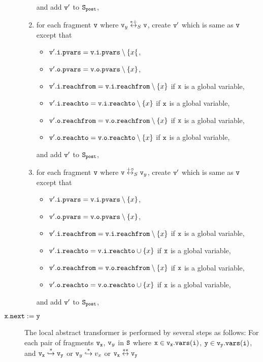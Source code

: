 \begin{description}
\begin{enumerate}
\begin{itemize}
\end{itemize}
and add $\mathtt{v}'$ to $\tt S_{post}$,
\item for each fragment $\mathtt{v}$ where $\mathtt{v}_y \overset{*+}\leftrightarrow_S \mathtt{v}$, create $\mathtt{v}'$ which is same as $\mathtt{v}$ except that 
\begin{itemize}
\item $\mathtt{v}'.\mathtt{i}.\mathtt{pvars} = \mathtt{v}.\mathtt{i}.\mathtt{pvars} \setminus \{x\{$,
\item $\mathtt{v}'.\mathtt{o}.\mathtt{pvars} = \mathtt{v}.\mathtt{o}.\mathtt{pvars} \setminus \left\{x\right\}$,
\item $\mathtt{v}'.\mathtt{i}.\mathtt{reachfrom} = \mathtt{v}.\mathtt{i}.\mathtt{reachfrom} \setminus \left\{x\right\}$ if $\tt x$ is a global variable,
\item $\mathtt{v}'.\mathtt{i}.\mathtt{reachto} = \mathtt{v}.\mathtt{i}.\mathtt{reachto} \setminus \left\{x\right\}$ if $\tt x$ is a global variable,
\item $\mathtt{v}'.\mathtt{o}.\mathtt{reachfrom} = \mathtt{v}.\mathtt{o}.\mathtt{reachfrom} \setminus \left\{x\right\}$ if $\tt x$ is a global variable,
\item $\mathtt{v}'.\mathtt{o}.\mathtt{reachto} = \mathtt{v}.\mathtt{o}.\mathtt{reachto} \setminus \left\{x\right\}$ if $\tt x$ is a global variable,
\end{itemize}
and add $\mathtt{v}'$ to $\tt S_{post}$,
\item for each fragment $\mathtt{v}$ where $\mathtt{v} \overset{+\circ}\leftrightarrow_S \mathtt{v}_y$, create $\mathtt{v}'$ which is same as $\mathtt{v}$ except that 
\begin{itemize}
\item $\mathtt{v}'.\mathtt{i}.\mathtt{pvars} = \mathtt{v}.\mathtt{i}.\mathtt{pvars} \setminus \left\{x\right\}$,
\item $\mathtt{v}'.\mathtt{o}.\mathtt{pvars} = \mathtt{v}.\mathtt{o}.\mathtt{pvars} \setminus \left\{x\right\}$,
\item $\mathtt{v}'.\mathtt{i}.\mathtt{reachfrom} = \mathtt{v}.\mathtt{i}.\mathtt{reachfrom} \setminus \left\{x\right\}$ if $\tt x$ is a global variable,
\item $\mathtt{v}'.\mathtt{i}.\mathtt{reachto} = \mathtt{v}.\mathtt{i}.\mathtt{reachto} \cup \left\{x\right\}$ if $\tt x$ is a global variable,
 \item $\mathtt{v}'.\mathtt{o}.\mathtt{reachfrom} = \mathtt{v}.\mathtt{o}.\mathtt{reachfrom} \setminus \left\{x\right\}$ if $\tt x$ is a global variable,
 \item $\mathtt{v}'.\mathtt{o}.\mathtt{reachto} = \mathtt{v}.\mathtt{o}.\mathtt{reachto} \cup \left\{x\right\}$ if $\tt x$ is a global variable,
\end{itemize}
and add $\mathtt{v}'$ to $\tt S_{post}$,
\end{enumerate}	
\item[${\tt x.next:= y}$]
   The local abstract transformer is performed by several steps as follows: For each pair of fragments $\tt v_x$, $\mathtt{v}_y$ in $\tt S$ where $\tt x \in v_x.{\tt vars}(\tt i)$, $\tt y \in \mathtt{v}_y.{\tt vars}(\tt i)$, and $\tt v_x \overset{*}\hookrightarrow \mathtt{v}_y$ or $\mathtt{v}_y \overset{*}\hookrightarrow v_x$ or $\tt v_x \overset{**}\leftrightarrow \mathtt{v}_y$

\end{description}
